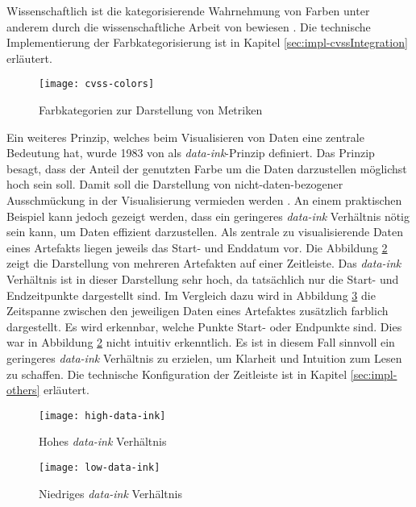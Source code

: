 Wissenschaftlich ist die kategorisierende Wahrnehmung von Farben unter anderem durch die wissenschaftliche Arbeit von \citeauthor{cliffordColorCategoriesAffect2010} bewiesen \autocite{cliffordColorCategoriesAffect2010}. Die technische Implementierung der Farbkategorisierung ist in Kapitel \ref{sec:impl-cvssIntegration} erläutert.
%
\begin{figure}
    \centering
    \texttt{[image: cvss-colors]}
    \caption{Farbkategorien zur Darstellung von Metriken}
    \label{fig:cvss-colors}
\end{figure}
%
\par Ein weiteres Prinzip, welches beim Visualisieren von Daten eine zentrale Bedeutung hat, wurde 1983 von \citeauthor{tufteBookReviewsVisual1984} als \textit{data-ink}-Prinzip definiert. Das Prinzip besagt, dass der Anteil der genutzten Farbe um die Daten darzustellen möglichst hoch sein soll. Damit soll die Darstellung von nicht-daten-bezogener Ausschmückung in der Visualisierung vermieden werden \autocite{tufteBookReviewsVisual1984}. An einem praktischen Beispiel kann jedoch gezeigt werden, dass ein geringeres \textit{data-ink} Verhältnis nötig sein kann, um Daten effizient darzustellen. Als zentrale zu visualisierende Daten eines Artefakts liegen jeweils das Start- und Enddatum vor. Die Abbildung \ref{fig:high-data-ink} zeigt die Darstellung von mehreren Artefakten auf einer Zeitleiste. Das \textit{data-ink} Verhältnis ist in dieser Darstellung sehr hoch, da tatsächlich nur die Start- und Endzeitpunkte dargestellt sind. Im Vergleich dazu wird in Abbildung \ref{fig:low-data-ink} die Zeitspanne zwischen den jeweiligen Daten eines Artefaktes zusätzlich farblich dargestellt. Es wird erkennbar, welche Punkte Start- oder Endpunkte sind. Dies war in Abbildung \ref{fig:high-data-ink} nicht intuitiv erkenntlich. Es ist in diesem Fall sinnvoll ein geringeres \textit{data-ink} Verhältnis zu erzielen, um Klarheit und Intuition zum Lesen zu schaffen. Die technische Konfiguration der Zeitleiste ist in Kapitel \ref{sec:impl-others} erläutert.
%
\begin{figure}
    \centering
    \texttt{[image: high-data-ink]}
    \caption{Hohes \textit{data-ink} Verhältnis}
    \label{fig:high-data-ink}
\end{figure}
%
\begin{figure}
    \centering
    \texttt{[image: low-data-ink]}
    \caption{Niedriges \textit{data-ink} Verhältnis}
    \label{fig:low-data-ink}
\end{figure}
